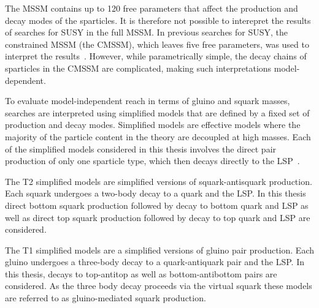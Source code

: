 The MSSM contains up to 120 free parameters that affect the production and decay modes of the sparticles.
It is therefore not possible to interepret the results of searches for SUSY in the full MSSM. 
In previous searches for SUSY, the constrained MSSM (the CMSSM), which leaves five free parameters, was 
used to interpret the results~\cite{CMSSM}. However, while parametrically simple, the decay chains of sparticles 
in the CMSSM are complicated, making such interpretations model-dependent. 

To evaluate model-independent reach in terms of gluino and squark masses, searches are interpreted using 
simplified models that are defined by a fixed set of production and decay modes.
Simplified models are effective models where the majority of the particle content in the theory 
are decoupled at high masses. Each of the simplified models considered in this thesis involves
the direct pair production of only one sparticle type, which then decays directly to the LSP~\cite{SMS}.

The T2 simplified models are simplified versions of squark-antisquark production. Each squark undergoes
a two-body decay to a quark and the LSP. In this thesis direct bottom squark production followed
by decay to bottom quark and LSP as well as direct top squark production followed by decay to top
quark and LSP are considered.

The T1 simplified models are a simplified versions of gluino pair production. Each gluino undergoes a three-body 
decay to a quark-antiquark pair and the LSP. In this thesis, decays to top-antitop as well as bottom-antibottom
pairs are considered. As the three body decay proceeds via the virtual squark these models 
are referred to as gluino-mediated squark production.

